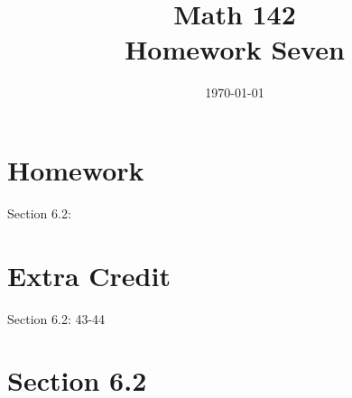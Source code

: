 \documentclass{exam}
\author{}
\date{\today}
\title{Math 142 \\ Homework Seven}
\begin{document}
  \maketitle

  \section{Homework}
  Section 6.2: 

  \section{Extra Credit}
  Section 6.2: 43-44

  \ifprintanswers

    \section{Section 6.2}
\end{document}
